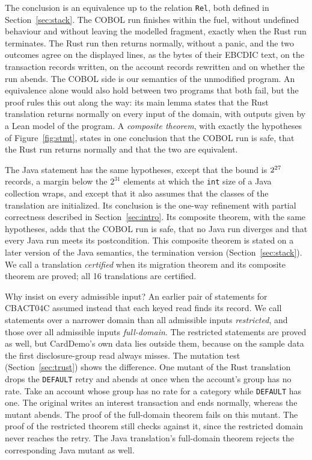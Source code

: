 The conclusion is an equivalence up to the relation \texttt{Rel}, both defined in Section~\ref{sec:stack}. The COBOL run finishes within the fuel, without
undefined behaviour and without leaving the modelled fragment, exactly when the Rust run terminates. The Rust run then returns normally, without a panic, and the
two outcomes agree on the displayed lines, as the bytes of their EBCDIC text, on the transaction records written, on
the account records rewritten and on whether the run abends. The COBOL side is our semantics of the unmodified program. An equivalence alone would also hold between two programs that both fail, but the proof rules
this out along the way: its main lemma states that the Rust translation returns normally on every input of the domain,
with outputs given by a Lean model of the program. A \emph{composite theorem}, with exactly the hypotheses of
Figure~\ref{fig:stmt}, states in one conclusion that the COBOL run is safe, that the Rust run returns normally and that the two are
equivalent.

The Java statement has the same hypotheses, except that the bound is $2^{27}$ records, a margin below the $2^{31}$
elements at which the \texttt{int} size of a Java collection wraps, and except that it also assumes that the classes
of the translation are initialized. Its conclusion is the one-way refinement with
partial correctness described in Section~\ref{sec:intro}. Its composite theorem, with the same hypotheses, adds that
the COBOL run is safe, that no Java run diverges and that every Java run meets its postcondition. This composite theorem is stated on a later version of the Java
semantics, the termination version (Section~\ref{sec:stack}). We call a translation
\emph{certified} when its migration theorem and its composite theorem are proved; all 16 translations are certified.

Why insist on every admissible input? An earlier pair of statements for CBACT04C assumed instead that each keyed read finds its record. We call statements
over a narrower domain than all admissible inputs \emph{restricted}, and those over all admissible inputs
\emph{full-domain}.
The restricted statements are proved as well, but CardDemo's own data lies outside them, because on the sample data
the first disclosure-group read always misses. The mutation test (Section~\ref{sec:trust}) shows the difference. One
mutant of the Rust translation drops the \texttt{DEFAULT} retry and abends at once when the account's group has no
rate. Take an account whose group has no rate for a category while \texttt{DEFAULT} has one. The original writes an
interest transaction and ends normally, whereas the mutant abends. The proof of the full-domain theorem fails on this
mutant. The proof of the restricted theorem still checks against it, since the restricted domain never reaches the
retry. The Java translation's full-domain theorem rejects the corresponding Java mutant as well.
